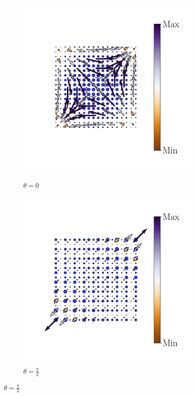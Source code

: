 \begin{figure}[h!]
\begin{minipage}[h!]{1.1\textwidth}
\begin{subfigure}[b!]{0.2 \textwidth}
             \label{}
         \end{subfigure}\hspace*{-0.5em}
          \begin{subfigure}[b!]{0.2 \textwidth}
             \caption*{$\theta = 0$}
             \includegraphics[width=\textwidth]{Imagenes/Resultados_pump_Cuadrado/xy/hoti_pomp_xy_pos3.pdf}
             \label{}
         \end{subfigure}\hspace*{-0.5em}
          \begin{subfigure}[b!]{0.2 \textwidth}
             \caption*{$\theta = \frac{\pi}{2}$}
             \includegraphics[width=\textwidth]{Imagenes/Resultados_pump_Cuadrado/xy/hoti_pomp_xy_pos4.pdf}

\end{subfigure}
\end{minipage}
\end{figure}
